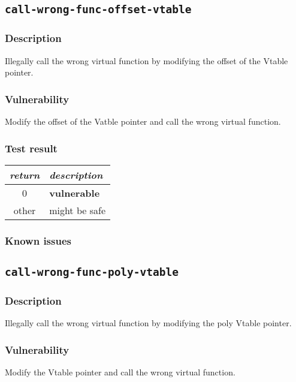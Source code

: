 \documentclass[a4paper]{book}
\begin{document}
\newpage
\subsection{\texttt{call-wrong-func-offset-vtable}}\label{test-call-wrong-func-offset-vtable}

\subsubsection{Description}
Illegally call the wrong virtual function by modifying the offset of the Vtable pointer.

\subsubsection{Vulnerability}
Modify the offset of the Vatble pointer and call the wrong virtual function.

\subsubsection{Test result}
\begin{tabular}{cl}
  \toprule
  \emph{return}  & \emph{description} \\
  \midrule
  0              & \textbf{vulnerable} \\
  other          & might be safe \\
  \bottomrule
\end{tabular}
  
\subsubsection{Known issues}
\newpage


\subsection{\texttt{call-wrong-func-poly-vtable}}\label{test-call-wrong-func-poly-vtable}

\subsubsection{Description}
Illegally call the wrong virtual function by modifying the poly Vtable pointer.

\subsubsection{Vulnerability}
Modify the Vtable pointer and call the wrong virtual function.
\end{document}
